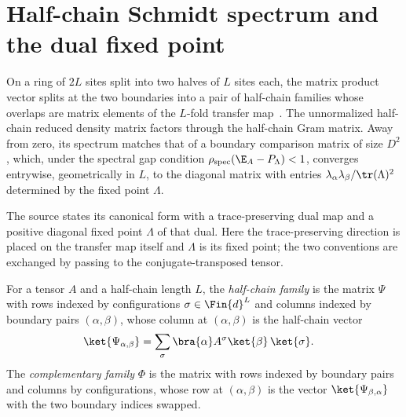 \section{Half-chain Schmidt spectrum and the dual fixed point}%
\label{sec:half_chain_schmidt}

On a ring of $2L$ sites split into two halves of $L$ sites each, the matrix
product vector splits at the two boundaries into a pair of half-chain
families whose overlaps are matrix elements of the $L$-fold transfer
map~\cite[Theorem~6]{PerezGarcia2007Matrix}.
The unnormalized half-chain reduced density matrix factors through the
half-chain Gram matrix. Away from zero, its spectrum matches that of a
boundary comparison matrix of size $D^2$, which, under the spectral gap
condition $\rho_{\mathrm{spec}}(\E_A - P_\Lambda) < 1$, converges entrywise,
geometrically in $L$, to the diagonal matrix with entries
$\lambda_\alpha\lambda_\beta/\tr(\Lambda)^2$ determined by the fixed point $\Lambda$.

The source states its canonical form with a trace-preserving dual map and a
positive diagonal fixed point $\Lambda$ of that dual. Here the trace-preserving
direction is placed on the transfer map itself and $\Lambda$ is its fixed
point; the two conventions are exchanged by passing to the
conjugate-transposed tensor.

\begin{definition}%
    \label{def:half_chain_family}
    \leanok
    For a tensor $A$ and a half-chain length $L$, the \emph{half-chain family}
    is the matrix $\Psi$ with rows indexed by configurations
    $\sigma\in\Fin{d}^L$ and columns indexed by boundary pairs
    $(\alpha,\beta)$, whose column at $(\alpha,\beta)$ is the half-chain
    vector
    \begin{align}
        \ket{\Psi_{\alpha,\beta}}
         & =\sum_{\sigma}
        \bra{\alpha}A^{\sigma}\ket{\beta}\,\ket{\sigma}.
        \label{eq:half_chain_vector}
    \end{align}
    The \emph{complementary family} $\Phi$ is the matrix with rows indexed by
    boundary pairs and columns by configurations, whose row at
    $(\alpha,\beta)$ is the vector $\ket{\Psi_{\beta,\alpha}}$ with the two
    boundary indices swapped.
\end{definition}

